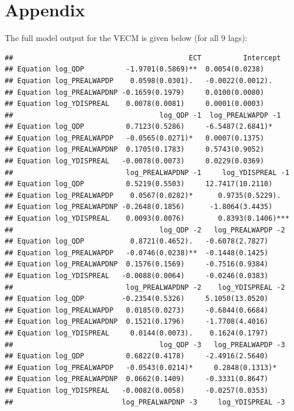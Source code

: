 \documentclass[11pt,preprint, authoryear]{elsarticle}
\numberwithin{equation}{section}
\numberwithin{figure}{section}
\numberwithin{table}{section}
\begin{document}
\newpage

\hypertarget{appendix}{%
\section{\texorpdfstring{Appendix
\label{app}}{Appendix }}\label{appendix}}

The full model output for the VECM is given below (for all 9 lags):

\begin{verbatim}
##                                          ECT          Intercept
## Equation log_QDP          -1.9701(0.5869)**  0.0054(0.0238)    
## Equation log_PREALWAPDP    0.0598(0.0301).   -0.0022(0.0012).  
## Equation log_PREALWAPDNP -0.1659(0.1979)     0.0100(0.0080)    
## Equation log_YDISPREAL    0.0078(0.0081)     0.0001(0.0003)    
##                                   log_QDP -1  log_PREALWAPDP -1
## Equation log_QDP          0.7123(0.5286)     -6.5487(2.6841)*  
## Equation log_PREALWAPDP   -0.0565(0.0271)*   0.0007(0.1375)    
## Equation log_PREALWAPDNP  0.1705(0.1783)     0.5743(0.9052)    
## Equation log_YDISPREAL   -0.0078(0.0073)     0.0229(0.0369)    
##                           log_PREALWAPDNP -1     log_YDISPREAL -1
## Equation log_QDP          0.5219(0.5503)     12.7417(10.2110)    
## Equation log_PREALWAPDP    0.0567(0.0282)*      0.9735(0.5229).  
## Equation log_PREALWAPDNP -0.2648(0.1856)      -1.8064(3.4435)    
## Equation log_YDISPREAL    0.0093(0.0076)        0.8393(0.1406)***
##                                   log_QDP -2   log_PREALWAPDP -2
## Equation log_QDP           0.8721(0.4652).   -0.6078(2.7827)    
## Equation log_PREALWAPDP   -0.0746(0.0238)**  -0.1448(0.1425)    
## Equation log_PREALWAPDNP  0.1576(0.1569)     -0.7516(0.9384)    
## Equation log_YDISPREAL   -0.0088(0.0064)     -0.0246(0.0383)    
##                           log_PREALWAPDNP -2    log_YDISPREAL -2
## Equation log_QDP         -0.2354(0.5326)     5.1050(13.0520)    
## Equation log_PREALWAPDP   0.0185(0.0273)     -0.6844(0.6684)    
## Equation log_PREALWAPDNP  0.1521(0.1796)     -1.7708(4.4016)    
## Equation log_YDISPREAL     0.0144(0.0073).    0.1624(0.1797)    
##                                   log_QDP -3   log_PREALWAPDP -3
## Equation log_QDP          0.6822(0.4178)     -2.4916(2.5640)    
## Equation log_PREALWAPDP   -0.0543(0.0214)*     0.2848(0.1313)*  
## Equation log_PREALWAPDNP  0.0662(0.1409)     -0.3331(0.8647)    
## Equation log_YDISPREAL   -0.0082(0.0058)     -0.0257(0.0353)    
##                          log_PREALWAPDNP -3     log_YDISPREAL -3

\end{verbatim}
\end{document}
